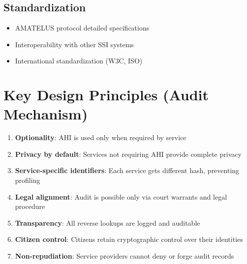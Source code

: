 \subsection{Standardization}

\begin{itemize}
  \item AMATELUS protocol detailed specifications
  \item Interoperability with other SSI systems
  \item International standardization (W3C, ISO)
\end{itemize}

\section*{Key Design Principles (Audit Mechanism)}

\begin{enumerate}
  \item \textbf{Optionality}: AHI is used only when required by service
  \item \textbf{Privacy by default}: Services not requiring AHI provide complete privacy
  \item \textbf{Service-specific identifiers}: Each service gets different hash, preventing profiling
  \item \textbf{Legal alignment}: Audit is possible only via court warrants and legal procedure
  \item \textbf{Transparency}: All reverse lookups are logged and auditable
  \item \textbf{Citizen control}: Citizens retain cryptographic control over their identities
  \item \textbf{Non-repudiation}: Service providers cannot deny or forge audit records
\end{enumerate}
